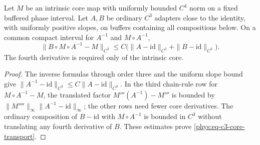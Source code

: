 \begin{lemma}\label{phys:lem-c3-core-transport}
Let \(M\) be an intrinsic core map with uniformly bounded \(C^4\)
norm on a fixed buffered phase interval. Let \(A,B\) be ordinary
\(C^3\) adapters close to the identity, with uniformly positive
slopes, on buffers containing all compositions below. On a common
compact interval for \(A^{-1}\) and \(M\circ A^{-1}\),
\begin{equation}\label{phys:eq-c3-core-transport}
 \|B\circ M\circ A^{-1}-M\|_{C^3}
 \le C\bigl(\|A-\mathrm{id}\|_{C^3}
              +\|B-\mathrm{id}\|_{C^3}\bigr).
\end{equation}
The fourth derivative is required only of the intrinsic core.
\end{lemma}
\begin{proof}
The inverse formulas through order three and the uniform slope bound
give \(\|A^{-1}-\mathrm{id}\|_{C^3}\le C\|A-\mathrm{id}\|_{C^3}\).
In the third chain-rule row for \(M\circ A^{-1}-M\), the translated
factor \(M'''(A^{-1})-M'''\) is bounded by
\(\|M''''\|_\infty\|A^{-1}-\mathrm{id}\|_\infty\); the other
rows need fewer core derivatives. The ordinary composition of
\(B-\mathrm{id}\) with \(M\circ A^{-1}\) is bounded in \(C^3\)
without translating any fourth derivative of \(B\). These estimates
prove \eqref{phys:eq-c3-core-transport}.
\end{proof}


